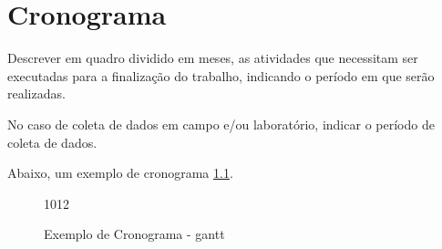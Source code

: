 \chapter{Cronograma}
Descrever em quadro dividido em meses, as atividades que necessitam ser executadas para a finalização do trabalho, indicando o período em que serão realizadas. 

No caso de coleta de dados em campo e/ou laboratório, indicar o período de coleta de dados.

Abaixo, um exemplo de cronograma \ref{fig:cronograma}.


\begin{figure}
	\caption{Exemplo de Cronograma - gantt}\label{fig:cronograma}
	\begin{gantt}{10}{12}
		\begin{ganttitle}
		\end{ganttitle}
	\end{gantt}
\end{figure}